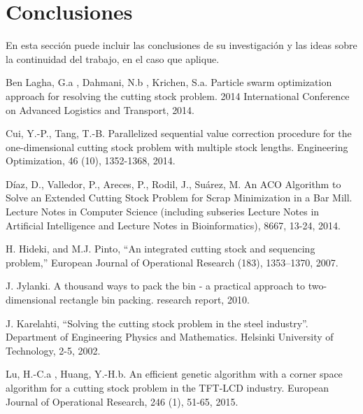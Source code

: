 \documentclass[a4paper,10pt,twocolumn]{article}
\begin{document}
\section{Conclusiones}\label{sec:conc}

  En esta sección puede incluir las conclusiones de su investigación y las ideas
  sobre la continuidad del trabajo, en el caso que aplique.


\begin{thebibliography}{99}
	 Ben Lagha, G.a , Dahmani, N.b , Krichen, S.a.
	Particle swarm optimization approach for resolving the
	cutting stock problem. 2014 International Conference
	on Advanced Logistics and Transport, 2014.
	
	  Cui, Y.-P., Tang, T.-B. Parallelized sequential value correction procedure for the one-dimensional cutting
	stock problem with multiple stock lengths. Engineering
	Optimization, 46 (10), 1352-1368, 2014.
	
	  Díaz, D., Valledor, P., Areces, P., Rodil, J., Suárez, M.
	An ACO Algorithm to Solve an Extended Cutting Stock
	Problem for Scrap Minimization in a Bar Mill. Lecture
	Notes in Computer Science (including subseries Lecture
	Notes in Artificial Intelligence and Lecture Notes in
	Bioinformatics), 8667, 13-24, 2014.
	
	 H. Hideki, and M.J. Pinto, “An integrated cutting
	stock and sequencing problem,” European Journal of
	Operational Research (183), 1353–1370, 2007.
	
	 J. Jylanki. A thousand ways to pack the bin - a
	practical approach to two-dimensional rectangle bin
	packing. research report, 2010.
	
	J. Karelahti, “Solving the cutting stock problem in
	the steel industry”. Department of Engineering Physics
	and Mathematics. Helsinki University of Technology,
	2-5, 2002.
	
	  Lu, H.-C.a , Huang, Y.-H.b. An efficient genetic
	algorithm with a corner space algorithm for a cutting
	stock problem in the TFT-LCD industry. European
	Journal of Operational Research, 246 (1), 51-65, 2015.
	

\end{thebibliography}
\end{document}
